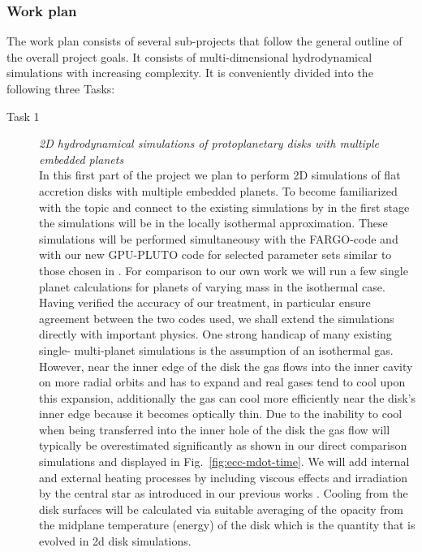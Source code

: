 \documentclass[10pt,fleqn,twoside]{article}
\begin{document}
\begin{description}
\end{description}

\subsubsection{Work plan}
%
The work plan consists of several sub-projects that follow the general outline of the
overall project goals. It consists of multi-dimensional hydrodynamical simulations with 
increasing complexity. It is conveniently divided into the following three Tasks:
%
\begin{description}
\item[Task 1]
{\it 2D hydrodynamical simulations of protoplanetary disks with multiple embedded planets}\\
In this first part of the project we plan to perform 2D simulations of flat accretion disks with multiple
embedded planets. To become familiarized with the topic and connect to the existing simulations
by \citet{2011ApJ...729...47Z} in the first stage the simulations will be in the locally isothermal approximation.
These simulations will be performed simultaneousy with the FARGO-code and with our new GPU-PLUTO code for
selected parameter sets similar to those chosen in \citet{2011ApJ...729...47Z}. For comparison to 
our own work \citep{2013A&A...560A..40M} we will run a few single planet calculations for planets of 
varying mass in the isothermal case.
Having verified the accuracy of our treatment, in particular ensure agreement between the two codes used,
we shall extend the simulations directly with important physics. One strong handicap of many existing 
single- multi-planet simulations is the assumption of an isothermal gas.
However, near the inner edge of the disk the gas flows into the inner cavity on more radial orbits
and has to expand and real gases tend to cool upon this expansion, additionally the gas can cool more efficiently near the
disk's inner edge because it becomes optically thin.
Due to the inability to cool when being transferred into the inner hole of the disk 
the gas flow will typically be overestimated
significantly as shown in our direct comparison simulations \citep{2013A&A...560A..40M} and displayed in Fig.~\ref{fig:ecc-mdot-time}.
We will add internal and external heating processes by including viscous effects and irradiation by the central star
as introduced in our previous works \citep{2008A&A...487L...9K,2012A&A...539A..18M,2013A&A...560A..40M}. 
Cooling from the disk surfaces will be calculated via suitable averaging of the opacity from the midplane temperature (energy)
of the disk which is the quantity that is evolved in 2d disk simulations. 


\end{description}
\end{document}
